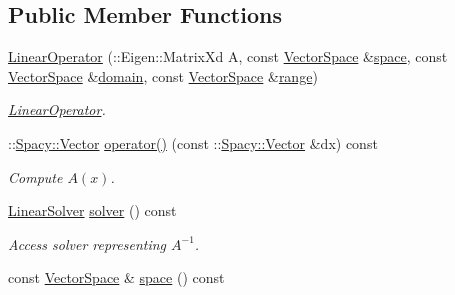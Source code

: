 \subsection*{\-Public \-Member \-Functions}
\begin{DoxyCompactItemize}
\item 
\hyperlink{classSpacy_1_1Rn_1_1LinearOperator_a5766be9cde54684c7318cc0f58fcda4c}{\-Linear\-Operator} (\-::\-Eigen\-::\-Matrix\-Xd \-A, const \hyperlink{classSpacy_1_1VectorSpace}{\-Vector\-Space} \&\hyperlink{classSpacy_1_1VectorBase_aa999dbf9d679d895dfe04c10fbf9f5e9}{space}, const \hyperlink{classSpacy_1_1VectorSpace}{\-Vector\-Space} \&\hyperlink{classSpacy_1_1OperatorBase_a2588f9b3e0188820c4c494e63293dc6f}{domain}, const \hyperlink{classSpacy_1_1VectorSpace}{\-Vector\-Space} \&\hyperlink{classSpacy_1_1OperatorBase_ab19d3b7a6f290b1079248f1e567e53d6}{range})
\begin{DoxyCompactList}\small\item\em \hyperlink{classSpacy_1_1Rn_1_1LinearOperator}{\-Linear\-Operator}. \end{DoxyCompactList}\item 
\hypertarget{classSpacy_1_1Rn_1_1LinearOperator_a804fce53cb8c2d1937fd0eae41718039}{\-::\hyperlink{classSpacy_1_1Vector}{\-Spacy\-::\-Vector} \hyperlink{classSpacy_1_1Rn_1_1LinearOperator_a804fce53cb8c2d1937fd0eae41718039}{operator()} (const \-::\hyperlink{classSpacy_1_1Vector}{\-Spacy\-::\-Vector} \&dx) const }\label{classSpacy_1_1Rn_1_1LinearOperator_a804fce53cb8c2d1937fd0eae41718039}

\begin{DoxyCompactList}\small\item\em \-Compute $A(x)$. \end{DoxyCompactList}\item 
\hypertarget{classSpacy_1_1Rn_1_1LinearOperator_a82989d016d28e2ae1fe5fa3d65df783d}{\hyperlink{classSpacy_1_1Rn_1_1LinearSolver}{\-Linear\-Solver} \hyperlink{classSpacy_1_1Rn_1_1LinearOperator_a82989d016d28e2ae1fe5fa3d65df783d}{solver} () const }\label{classSpacy_1_1Rn_1_1LinearOperator_a82989d016d28e2ae1fe5fa3d65df783d}

\begin{DoxyCompactList}\small\item\em \-Access solver representing $A^{-1}$. \end{DoxyCompactList}\item 
\hypertarget{classSpacy_1_1VectorBase_aa999dbf9d679d895dfe04c10fbf9f5e9}{const \hyperlink{classSpacy_1_1VectorSpace}{\-Vector\-Space} \& \hyperlink{classSpacy_1_1VectorBase_aa999dbf9d679d895dfe04c10fbf9f5e9}{space} () const }\label{classSpacy_1_1VectorBase_aa999dbf9d679d895dfe04c10fbf9f5e9}


\end{DoxyCompactItemize}
